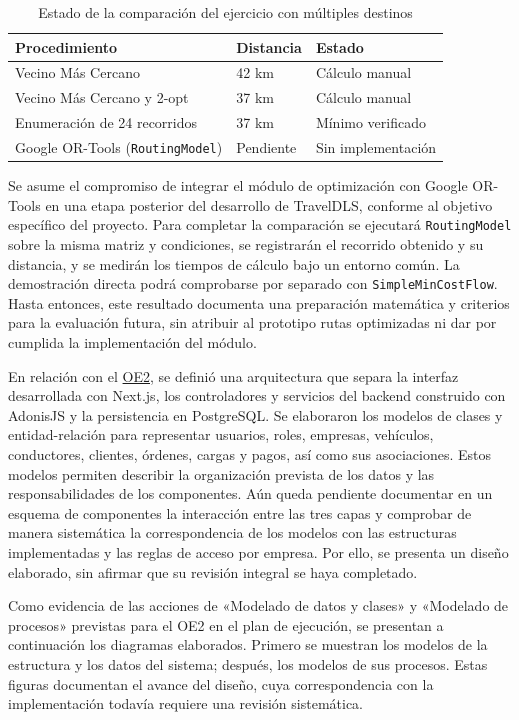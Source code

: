 \begin{table}[H]
\centering
\caption{Estado de la comparación del ejercicio con múltiples destinos}
\label{tab:comparacion-rutas-preliminar}
\begin{tabular}{@{}p{}p{}p{}@{}}
\toprule
Procedimiento & Distancia & Estado \\
\midrule
Vecino Más Cercano & 42 km & Cálculo manual \\
Vecino Más Cercano y 2-opt & 37 km & Cálculo manual \\
Enumeración de 24 recorridos & 37 km & Mínimo verificado \\
Google OR-Tools (\texttt{RoutingModel}) & Pendiente & Sin implementación \\
\bottomrule
\end{tabular}
\end{table}

Se asume el compromiso de integrar el módulo de optimización con Google OR-Tools en una etapa posterior del desarrollo de TravelDLS, conforme al objetivo específico del proyecto. Para completar la comparación se ejecutará \texttt{RoutingModel} sobre la misma matriz y condiciones, se registrarán el recorrido obtenido y su distancia, y se medirán los tiempos de cálculo bajo un entorno común. La demostración directa podrá comprobarse por separado con \texttt{SimpleMinCostFlow}. Hasta entonces, este resultado documenta una preparación matemática y criterios para la evaluación futura, sin atribuir al prototipo rutas optimizadas ni dar por cumplida la implementación del módulo.

En relación con el \hyperlink{plan-oe2}{OE2}, se definió una arquitectura que separa la interfaz desarrollada con Next.js, los controladores y servicios del backend construido con AdonisJS y la persistencia en PostgreSQL. Se elaboraron los modelos de clases y entidad-relación para representar usuarios, roles, empresas, vehículos, conductores, clientes, órdenes, cargas y pagos, así como sus asociaciones. Estos modelos permiten describir la organización prevista de los datos y las responsabilidades de los componentes. Aún queda pendiente documentar en un esquema de componentes la interacción entre las tres capas y comprobar de manera sistemática la correspondencia de los modelos con las estructuras implementadas y las reglas de acceso por empresa. Por ello, se presenta un diseño elaborado, sin afirmar que su revisión integral se haya completado.

Como evidencia de las acciones de «Modelado de datos y clases» y «Modelado de procesos» previstas para el OE2 en el plan de ejecución, se presentan a continuación los diagramas elaborados. Primero se muestran los modelos de la estructura y los datos del sistema; después, los modelos de sus procesos. Estas figuras documentan el avance del diseño, cuya correspondencia con la implementación todavía requiere una revisión sistemática.

